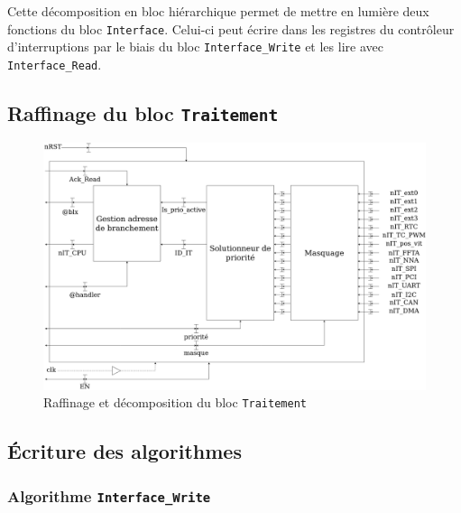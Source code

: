 Cette décomposition en bloc hiérarchique permet de mettre en lumière deux fonctions du bloc \texttt{Interface}.
Celui-ci peut écrire dans les registres du contrôleur d'interruptions par le biais du bloc \texttt{Interface\_Write} et les lire avec \texttt{Interface\_Read}.

\subsection{Raffinage du bloc \texttt{Traitement}}

\begin{figure}[H]
	\centering
	\includegraphics[width=1\linewidth]{figure/raffinage_traitement.png}
	\caption{Raffinage et décomposition du bloc \texttt{Traitement}}
	\label{fig:raffinage_traitement}
\end{figure}

\newpage

\subsection{Écriture des algorithmes}

\subsubsection{Algorithme \texttt{Interface\_Write}}

